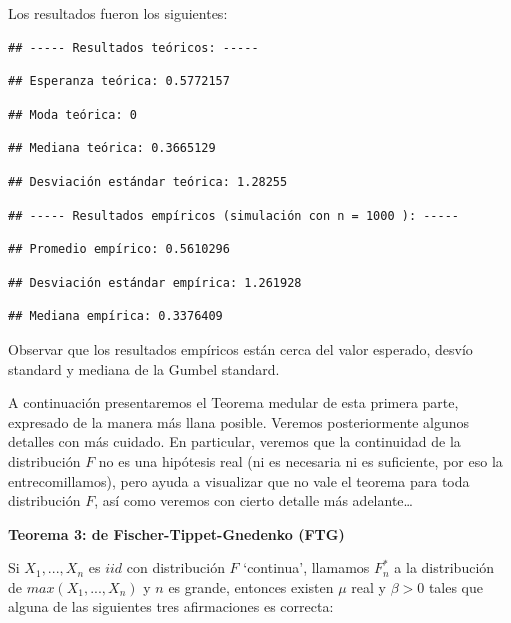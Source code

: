 \documentclass[
]{book}
\theoremstyle{definition}
\theoremstyle{definition}
\theoremstyle{definition}
\theoremstyle{definition}
\theoremstyle{remark}
\begin{document}
Los resultados fueron los siguientes:

\begin{verbatim}
## ----- Resultados teóricos: -----
\end{verbatim}

\begin{verbatim}
## Esperanza teórica: 0.5772157
\end{verbatim}

\begin{verbatim}
## Moda teórica: 0
\end{verbatim}

\begin{verbatim}
## Mediana teórica: 0.3665129
\end{verbatim}

\begin{verbatim}
## Desviación estándar teórica: 1.28255
\end{verbatim}

\begin{verbatim}
## ----- Resultados empíricos (simulación con n = 1000 ): -----
\end{verbatim}

\begin{verbatim}
## Promedio empírico: 0.5610296
\end{verbatim}

\begin{verbatim}
## Desviación estándar empírica: 1.261928
\end{verbatim}

\begin{verbatim}
## Mediana empírica: 0.3376409
\end{verbatim}

Observar que los resultados empíricos están cerca del valor esperado, desvío standard y mediana de la Gumbel standard.

A continuación presentaremos el Teorema medular de esta primera parte, expresado de la manera más llana posible. Veremos posteriormente algunos detalles con más cuidado. En particular, veremos que la continuidad de la distribución \(F\) no
es una hipótesis real (ni es necesaria ni es suficiente, por eso la
entrecomillamos), pero ayuda a visualizar que no vale el teorema para toda distribución \(F\), así como veremos con cierto detalle más adelante\ldots{}

\textbf{Teorema 3: de Fischer-Tippet-Gnedenko (FTG)}

Si \(X_1,...,X_n\) es \(iid\) con distribución \(F\) `continua',
llamamos \(F^{\ast}_n\) a la distribución de \(max(X_1,...,X_n)\) y \(n\)
es grande, entonces existen \(\mu\) real y \(\beta > 0\) tales que
alguna de las siguientes tres afirmaciones es
correcta:
\end{document}
